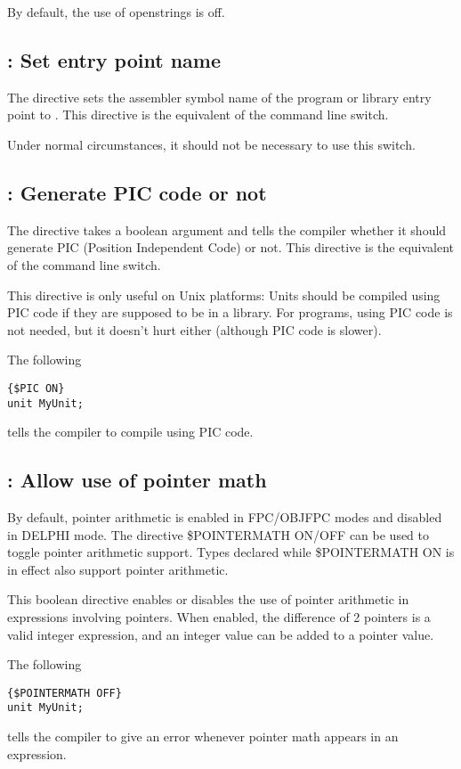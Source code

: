 By default, the use of openstrings is off.

\subsection{ : Set entry point name}
\label{se:Pascalmainname}
The  directive sets the assembler
symbol name of the program or library entry point to .
This directive is the equivalent of the  command line switch.

Under normal circumstances, it should not be necessary to use this
switch.

\subsection{ : Generate PIC code or not}
\label{se:Pic}
The  directive takes a boolean argument and tells the
compiler whether it should generate PIC (Position Independent Code) or not.
This directive is the equivalent of the  command line switch.


This directive is only useful on Unix platforms: Units should be compiled 
using PIC code if they are supposed to be in a library. For programs, using
PIC code is not needed, but it doesn't hurt either (although PIC code is
slower).

The following 
\begin{verbatim}
{$PIC ON}
unit MyUnit;
\end{verbatim}
tells the compiler to compile  using PIC code.

\subsection{ : Allow use of pointer math}

By default, pointer arithmetic is enabled in FPC/OBJFPC modes and disabled in DELPHI mode. 
The directive {\$POINTERMATH ON/OFF} can be used to toggle pointer arithmetic support. 
Types declared while {\$POINTERMATH ON} is in effect also support pointer arithmetic. 

This boolean directive enables or disables the use of pointer arithmetic in
expressions involving pointers. 
When enabled, the difference of 2 pointers is a valid integer expression, and an integer value 
can be added to a pointer value.

The following 
\begin{verbatim}
{$POINTERMATH OFF}
unit MyUnit;
\end{verbatim}
tells the compiler to give an error whenever pointer math appears in an expression.

